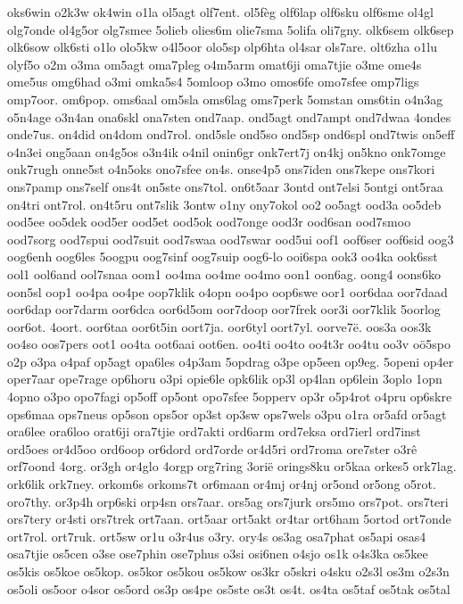 oks6win
o2k3w
ok4win
o1la
ol5agt
olf7ent.
ol5fèg
olf6lap
olf6sku
olf6sme
ol4gl
olg7onde
ol4g5or
olg7smee
5olieb
olies6m
olie7sma
5olifa
oli7gny.
olk6sem
olk6sep
olk6sow
olk6sti
o1lo
olo5kw
o4l5oor
olo5sp
olp6hta
ol4sar
ols7are.
olt6zha
o1lu
olyf5o
o2m
o3ma
om5agt
oma7pleg
o4m5arm
omat6ji
oma7tjie
o3me
ome4s
ome5us
omg6had
o3mi
omka5s4
5omloop
o3mo
omos6fe
omo7sfee
omp7ligs
omp7oor.
om6pop.
oms6aal
om5sla
oms6lag
oms7perk
5omstan
oms6tin
o4n3ag
o5n4age
o3n4an
ona6skl
ona7sten
ond7aap.
ond5agt
ond7ampt
ond7dwaa
4ondes
onde7us.
on4did
on4dom
ond7rol.
ond5sle
ond5so
ond5sp
ond6spl
ond7twis
on5eff
o4n3ei
ong5aan
on4g5os
o3n4ik
o4nil
onin6gr
onk7ert7j
on4kj
on5kno
onk7omge
onk7rugh
onne5st
o4n5oks
ono7sfee
on4s.
onse4p5
ons7iden
ons7kepe
ons7kori
ons7pamp
ons7self
ons4t
on5ste
ons7tol.
on6t5aar
3ontd
ont7elsi
5ontgi
ont5raa
on4tri
ont7rol.
on4t5ru
ont7slik
3ontw
o1ny
ony7okol
oo2
oo5agt
ood3a
oo5deb
ood5ee
oo5dek
ood5er
ood5et
ood5ok
ood7onge
ood3r
ood6san
ood7smoo
ood7sorg
ood7spui
ood7suit
ood7swaa
ood7swar
ood5ui
oof1
oof6ser
oof6sid
oog3
oog6enh
oog6les
5oogpu
oog7sinf
oog7suip
oog6-lo
ooi6spa
ook3
oo4ka
ook6sst
ool1
ool6and
ool7snaa
oom1
oo4ma
oo4me
oo4mo
oon1
oon6ag.
oong4
oons6ko
oon5sl
oop1
oo4pa
oo4pe
oop7klik
o4opn
oo4po
oop6swe
oor1
oor6daa
oor7daad
oor6dap
oor7darm
oor6dca
oor6d5om
oor7doop
oor7frek
oor3i
oor7klik
5oorlog
oor6ot.
4oort.
oor6taa
oor6t5in
oort7ja.
oor6tyl
oort7yl.
oorve7ë.
oos3a
oos3k
oo4so
oos7pers
oot1
oo4ta
oot6aai
oot6en.
oo4ti
oo4to
oo4t3r
oo4tu
oo3v
oö5spo
o2p
o3pa
o4paf
op5agt
opa6les
o4p3am
5opdrag
o3pe
op5een
op9eg.
5openi
op4er
oper7aar
ope7rage
op6horu
o3pi
opie6le
opk6lik
op3l
op4lan
op6lein
3oplo
1opn
4opno
o3po
opo7fagi
op5off
op5ont
opo7sfee
5opperv
op3r
o5p4rot
o4pru
op6skre
ops6maa
ops7neus
op5son
ops5or
op3st
op3sw
ops7wels
o3pu
o1ra
or5afd
or5agt
ora6lee
ora6loo
orat6ji
ora7tjie
ord7akti
ord6arm
ord7eksa
ord7ierl
ord7inst
ord5oes
or4d5oo
ord6oop
or6dord
ord7orde
or4d5ri
ord7roma
ore7ster
o3rê
orf7oond
4org.
or3gh
or4glo
4orgp
org7ring
3orië
orings8ku
or5kaa
orkes5
ork7lag.
ork6lik
ork7ney.
orkom6s
orkoms7t
or6maan
or4mj
or4nj
or5ond
or5ong
o5rot.
oro7thy.
or3p4h
orp6ski
orp4sn
ors7aar.
ors5ag
ors7jurk
ors5mo
ors7pot.
ors7teri
ors7tery
or4sti
ors7trek
ort7aan.
ort5aar
ort5akt
or4tar
ort6ham
5ortod
ort7onde
ort7rol.
ort7ruk.
ort5sw
or1u
o3r4us
o3ry.
ory4s
os3ag
osa7phat
os5api
osas4
osa7tjie
os5cen
o3se
ose7phin
ose7phus
o3si
osi6nen
o4sjo
os1k
o4s3ka
os5kee
os5kis
os5koe
os5kop.
os5kor
os5kou
os5kow
os3kr
o5skri
o4sku
o2s3l
os3m
o2s3n
os5oli
os5oor
o4sor
os5ord
os3p
os4pe
os5ste
os3t
os4t.
os4ta
os5taf
os5tak
os5tal

